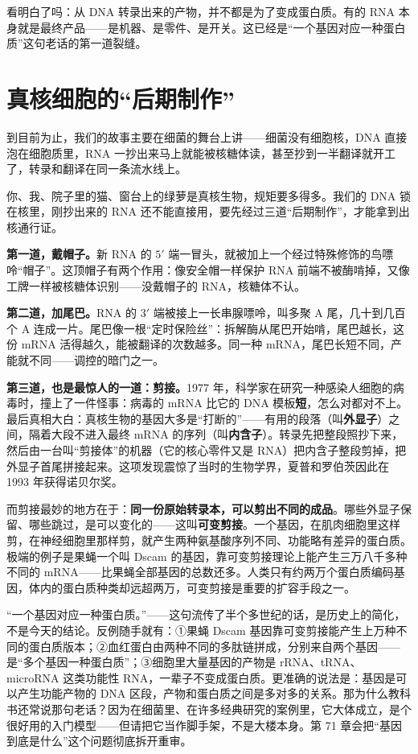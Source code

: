 看明白了吗：从 DNA 转录出来的产物，并不都是为了变成蛋白质。有的 RNA 本身就是最终产品——是机器、是零件、是开关。这已经是“一个基因对应一种蛋白质”这句老话的第一道裂缝。

\section{真核细胞的“后期制作”}

到目前为止，我们的故事主要在细菌的舞台上讲——细菌没有细胞核，DNA 直接泡在细胞质里，RNA 一抄出来马上就能被核糖体读，甚至抄到一半翻译就开工了，转录和翻译在同一条流水线上。

你、我、院子里的猫、窗台上的绿萝是真核生物，规矩要多得多。我们的 DNA 锁在核里，刚抄出来的 RNA 还不能直接用，要先经过三道“后期制作”，才能拿到出核通行证。

\textbf{第一道，戴帽子。}新 RNA 的 $5'$ 端一冒头，就被加上一个经过特殊修饰的鸟嘌呤“帽子”。这顶帽子有两个作用：像安全帽一样保护 RNA 前端不被酶啃掉，又像工牌一样被核糖体识别——没戴帽子的 RNA，核糖体不认。

\textbf{第二道，加尾巴。}RNA 的 $3'$ 端被接上一长串腺嘌呤，叫多聚 A 尾，几十到几百个 A 连成一片。尾巴像一根“定时保险丝”：拆解酶从尾巴开始啃，尾巴越长，这份 mRNA 活得越久，能被翻译的次数越多。同一种 mRNA，尾巴长短不同，产能就不同——调控的暗门之一。

\textbf{第三道，也是最惊人的一道：剪接。}1977 年，科学家在研究一种感染人细胞的病毒时，撞上了一件怪事：病毒的 mRNA 比它的 DNA 模板\textbf{短}，怎么对都对不上。最后真相大白：真核生物的基因大多是“打断的”——有用的段落（叫\textbf{外显子}）之间，隔着大段不进入最终 mRNA 的序列（叫\textbf{内含子}）。转录先把整段照抄下来，然后由一台叫“剪接体”的机器（它的核心零件又是 RNA）把内含子整段剪掉，把外显子首尾拼接起来。这项发现震惊了当时的生物学界，夏普和罗伯茨因此在 1993 年获得诺贝尔奖。

而剪接最妙的地方在于：\textbf{同一份原始转录本，可以剪出不同的成品}。哪些外显子保留、哪些跳过，是可以变化的——这叫\textbf{可变剪接}。一个基因，在肌肉细胞里这样剪，在神经细胞里那样剪，就产生两种氨基酸序列不同、功能略有差异的蛋白质。极端的例子是果蝇一个叫 Dscam 的基因，靠可变剪接理论上能产生三万八千多种不同的 mRNA——比果蝇全部基因的总数还多。人类只有约两万个蛋白质编码基因，体内的蛋白质种类却远超两万，可变剪接是重要的扩容手段之一。

\begin{wuqu}
“一个基因对应一种蛋白质。”——这句流传了半个多世纪的话，是历史上的简化，不是今天的结论。反例随手就有：①果蝇 Dscam 基因靠可变剪接能产生上万种不同的蛋白质版本；②血红蛋白由两种不同的多肽链拼成，分别来自两个基因——是“多个基因一种蛋白质”；③细胞里大量基因的产物是 rRNA、tRNA、microRNA 这类功能性 RNA，一辈子不变成蛋白质。更准确的说法是：基因是可以产生功能产物的 DNA 区段，产物和蛋白质之间是多对多的关系。那为什么教科书还常说那句老话？因为在细菌里、在许多经典研究的案例里，它大体成立，是个很好用的入门模型——但请把它当作脚手架，不是大楼本身。第 71 章会把“基因到底是什么”这个问题彻底拆开重审。
\end{wuqu}


